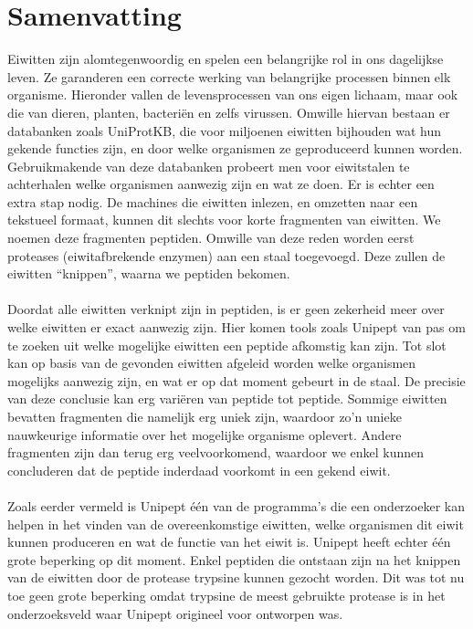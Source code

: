 \chapter*{Samenvatting}
Eiwitten zijn alomtegenwoordig en spelen een belangrijke rol in ons dagelijkse leven.
Ze garanderen een correcte werking van belangrijke processen binnen elk organisme.
Hieronder vallen de levensprocessen van ons eigen lichaam, maar ook die van dieren, planten, bacteriën en zelfs virussen.
Omwille hiervan bestaan er databanken zoals UniProtKB, die voor miljoenen eiwitten bijhouden wat hun gekende functies zijn, en door welke organismen ze geproduceerd kunnen worden.
Gebruikmakende van deze databanken probeert men voor eiwitstalen te achterhalen welke organismen aanwezig zijn en wat ze doen.
Er is echter een extra stap nodig.
De machines die eiwitten inlezen, en omzetten naar een tekstueel formaat, kunnen dit slechts voor korte fragmenten van eiwitten.
We noemen deze fragmenten peptiden.
Omwille van deze reden worden eerst proteases (eiwitafbrekende enzymen) aan een staal toegevoegd.
Deze zullen de eiwitten ``knippen'', waarna we peptiden bekomen.
\\ \\
Doordat alle eiwitten verknipt zijn in peptiden, is er geen zekerheid meer over welke eiwitten er exact aanwezig zijn.
Hier komen tools zoals Unipept van pas om te zoeken uit welke mogelijke eiwitten een peptide afkomstig kan zijn.
Tot slot kan op basis van de gevonden eiwitten afgeleid worden welke organismen mogelijks aanwezig zijn, en wat er op dat moment gebeurt in de staal.
De precisie van deze conclusie kan erg variëren van peptide tot peptide.
Sommige eiwitten bevatten fragmenten die namelijk erg uniek zijn, waardoor zo'n unieke nauwkeurige informatie over het mogelijke organisme oplevert.
Andere fragmenten zijn dan terug erg veelvoorkomend, waardoor we enkel kunnen concluderen dat de peptide inderdaad voorkomt in een gekend eiwit.
\\ \\
Zoals eerder vermeld is Unipept één van de programma's die een onderzoeker kan helpen in het vinden van de overeenkomstige eiwitten, welke organismen dit eiwit kunnen produceren en wat de functie van het eiwit is.
Unipept heeft echter één grote beperking op dit moment.
Enkel peptiden die ontstaan zijn na het knippen van de eiwitten door de protease trypsine kunnen gezocht worden.
Dit was tot nu toe geen grote beperking omdat trypsine de meest gebruikte protease is in het onderzoeksveld waar Unipept origineel voor ontworpen was.
